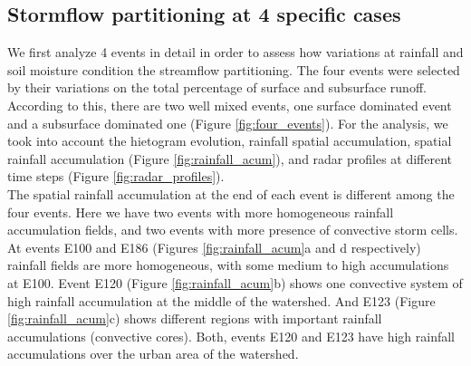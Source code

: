 \documentclass[preprint,12pt]{elsarticle}
\begin{document}
\subsection{Stormflow partitioning at 4 specific cases } \label{sec:4Cases}

We first analyze 4 events in detail in order to assess how variations at rainfall and soil moisture condition the streamflow partitioning. The four events were selected by their variations on the total percentage of surface and subsurface runoff.  According to this, there are two well mixed events, one surface dominated event and a subsurface dominated one (Figure \ref{fig:four_events}). For the analysis, we took into account the hietogram evolution, rainfall spatial accumulation, spatial rainfall accumulation (Figure \ref{fig:rainfall_acum}), and radar profiles at different time steps (Figure \ref{fig:radar_profiles}).  \\

The spatial rainfall accumulation at the end of each event is different among the four events. Here we have two events with more homogeneous rainfall accumulation fields, and two events with more presence of convective storm cells. At events E100 and E186 (Figures \ref{fig:rainfall_acum}a and d respectively) rainfall fields are more homogeneous, with some medium to high accumulations at E100. Event E120 (Figure \ref{fig:rainfall_acum}b) shows one convective system of high rainfall accumulation at the middle of the watershed.  And E123 (Figure \ref{fig:rainfall_acum}c) shows different regions with important rainfall accumulations (convective cores).  Both, events E120 and E123 have high rainfall accumulations over the urban area of the watershed.\\
\end{document}
